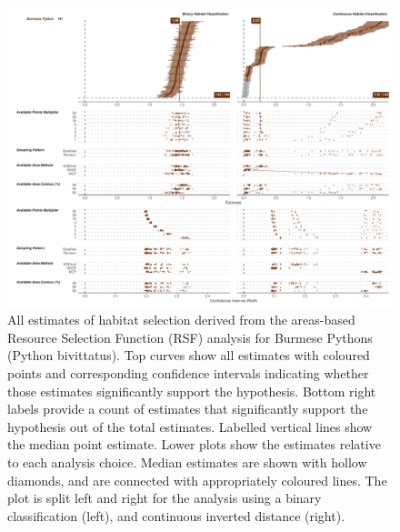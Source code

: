 \documentclass[10pt,a4paper]{article}
\begin{document}
\begin{figure}[h]
\includegraphics[width=1\linewidth]{../../figures/specCurve_Burmese Python_rsf} \caption{All estimates of habitat selection derived from the areas-based Resource Selection Function (RSF) analysis for Burmese Pythons (Python bivittatus). Top curves show all estimates with coloured points and corresponding confidence intervals indicating whether those estimates significantly support the hypothesis. Bottom right labels provide a count of estimates that significantly support the hypothesis out of the total estimates. Labelled vertical lines show the median point estimate. Lower plots show the estimates relative to each analysis choice. Median estimates are shown with hollow diamonds, and are connected with appropriately coloured lines. The plot is split left and right for the analysis using a binary classification (left), and continuous inverted distance (right).}\label{fig:specCurveRsfPYBI}
\end{figure}
\end{document}

